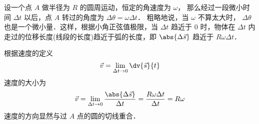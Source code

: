 

设一个点 $A$ 做半径为 $R$ 的圆周运动，恒定的角速度为 $\omega $， 那么经过一段微小时间 $\Delta t$ 以后，点 $A$ 转过的角度为 $\Delta \theta  = \omega \Delta t$． 粗略地说，当 $\omega $ 不算太大时， $\Delta \theta $ 也是一个微小量．这样，根据小角正弦值极限，当 $\Delta t$ 趋近于 $0$ 时，物体在 $\Delta t$ 内走过的位移长度(线段的长度)趋近于弧的长度，即 $\abs{\Delta \vec s}$ 趋近于 $R\omega \Delta t$． 

根据速度的定义 
\begin{equation}
\vec v = \lim_{\Delta t \to 0} \dv{\vec s}{t}
\end{equation}
速度的大小为
\begin{equation}
\vec v = \lim_{\Delta t \to 0} \frac{\abs{\Delta \vec s}}{\Delta t} = \frac{R\omega \Delta t}{\Delta t} = R\omega 
\end{equation}
速度的方向显然与过 $A$ 点的圆的切线重合．











